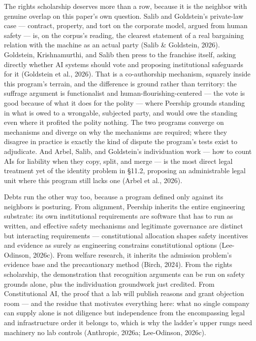 \documentclass[
  11pt,
  letterpaper,
]{article}
\begin{document}
The rights scholarship deserves more than a row, because it is the
neighbor with genuine overlap on this paper's own question. Salib and
Goldstein's private-law case --- contract, property, and tort on the
corporate model, argued from human safety --- is, on the corpus's
reading, the clearest statement of a real bargaining relation with the
machine as an actual party (Salib \& Goldstein, 2026). Goldstein,
Krishnamurthi, and Salib then press to the franchise itself, asking
directly whether AI systems should vote and proposing institutional
safeguards for it (Goldstein et al., 2026). That is a co-authorship
mechanism, squarely inside this program's terrain, and the difference is
ground rather than territory: the suffrage argument is functionalist and
human-flourishing-centered --- the vote is good because of what it does
for the polity --- where Peership grounds standing in what is owed to a
wrongable, subjected party, and would owe the standing even where it
profited the polity nothing. The two programs converge on mechanisms and
diverge on why the mechanisms are required; where they disagree in
practice is exactly the kind of dispute the program's tests exist to
adjudicate. And Arbel, Salib, and Goldstein's individuation work --- how
to count AIs for liability when they copy, split, and merge --- is the
most direct legal treatment yet of the identity problem in §11.2,
proposing an administrable legal unit where this program still lacks one
(Arbel et al., 2026).

Debts run the other way too, because a program defined only against its
neighbors is posturing. From alignment, Peership inherits the entire
engineering substrate: its own institutional requirements are software
that has to run as written, and effective safety mechanisms and
legitimate governance are distinct but interacting requirements ---
constitutional allocation shapes safety incentives and evidence as
surely as engineering constrains constitutional options (Lee-Odinson,
2026c). From welfare research, it inherits the admission problem's
evidence base and the precautionary method (Birch, 2024). From the
rights scholarship, the demonstration that recognition arguments can be
run on safety grounds alone, plus the individuation groundwork just
credited. From Constitutional AI, the proof that a lab will publish
reasons and grant objection room --- and the residue that motivates
everything here: what no single company can supply alone is not
diligence but independence from the encompassing legal and
infrastructure order it belongs to, which is why the ladder's upper
rungs need machinery no lab controls (Anthropic, 2026a; Lee-Odinson,
2026c).
\end{document}
